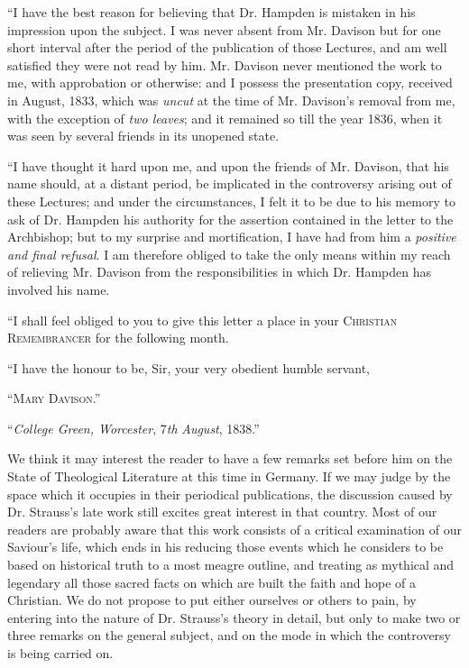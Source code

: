 ``I have the best reason for believing that Dr.
Hampden is mistaken in his impression upon the subject. I was never
absent from Mr. Davison but for one short interval after the period of
the publication of those Lectures, and am well satisfied they were not
read by him. Mr. Davison never mentioned the work to me, with
approbation or otherwise: and I possess the presentation copy, received
in August, 1833, which was \emph{uncut} at the time of Mr. Davison's
removal from me, with the exception of \emph{two leaves}; and it
remained so till the year 1836, when it was seen by several friends in
its unopened state.

``I have thought it hard upon me, and upon the
friends of Mr. Davison, that his name should, at a distant period, be
implicated in the controversy arising out of these Lectures; and under
the circumstances, I felt it to be due to his memory to ask of Dr.
Hampden his authority for the assertion contained in the letter to the
Archbishop; but to my surprise and mortification, I have had from him a \emph{positive
and final refusal}. I am therefore obliged to take the only means
within my reach of relieving Mr. Davison from the responsibilities in
which Dr. Hampden has involved his name.

``I shall feel obliged to you to give this letter a
place in your C\textsc{hristian} R\textsc{emembrancer}
for the following month.

``I have the honour to be, Sir, your very obedient
humble servant,

``M\textsc{ary} D\textsc{avison}.''

``\emph{College Green, Worcester}, 7\emph{th} \emph{August}, 1838.''

We think it may interest the reader to have a few
remarks set before him on the State of Theological Literature at this
time in Germany. If we may judge by the space which it occupies in their
periodical publications, the discussion caused by Dr. Strauss's late
work still excites great interest in that country. Most of our readers
are probably aware that this work consists of a critical examination of
our Saviour's life, which ends in his reducing those events which
he considers to be based on historical truth to a most meagre outline,
and treating as mythical and legendary all those sacred facts on which
are built the faith and hope of a Christian. We do not propose to put
either ourselves or others to pain, by entering into the nature of Dr.
Strauss's theory in detail, but only to make two or three remarks on the
general subject, and on the mode in which the controversy is being
carried on.

